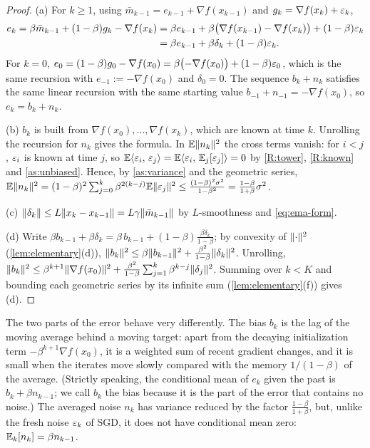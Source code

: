 \begin{proof}
(a) For $k\ge1$, using $\bar m_{k-1}=e_{k-1}+\nabla f(x_{k-1})$ and $g_k=\nabla f(x_k)+\varepsilon_k$,
\begin{align*}
  e_k=\beta\bar m_{k-1}+(1-\beta)g_k-\nabla f(x_k)
  &=\beta e_{k-1}+\beta\bigl(\nabla f(x_{k-1})-\nabla f(x_k)\bigr)+(1-\beta)\varepsilon_k\\
  &=\beta e_{k-1}+\beta\delta_k+(1-\beta)\varepsilon_k .
\end{align*}
For $k=0$, $e_0=(1-\beta)g_0-\nabla f(x_0)=\beta\bigl(-\nabla f(x_0)\bigr)+(1-\beta)\varepsilon_0$, which is the
same recursion with $e_{-1}:=-\nabla f(x_0)$ and $\delta_0=0$. The sequence $b_k+n_k$ satisfies
the same linear recursion with the same starting value $b_{-1}+n_{-1}=-\nabla f(x_0)$, so
$e_k=b_k+n_k$.

(b) $b_k$ is built from $\nabla f(x_0),\dots,\nabla f(x_k)$, which are known at time $k$.
Unrolling the recursion for $n_k$ gives the formula. In $\mathbb{E}\lVert n_k\rVert^2$ the cross terms
vanish: for $i<j$, $\varepsilon_i$ is known at time $j$, so
$\mathbb{E}\langle \varepsilon_i,\, \varepsilon_j\rangle=\mathbb{E}\langle \varepsilon_i,\, \mathbb{E}_j[\varepsilon_j]\rangle=0$ by \ref{R:tower}, \ref{R:known} and
\cref{as:unbiased}. Hence, by \cref{as:variance} and the geometric series,
$\mathbb{E}\lVert n_k\rVert^2=(1-\beta)^2\sum_{j=0}^k\beta^{2(k-j)}\mathbb{E}\lVert \varepsilon_j\rVert^2\le\frac{(1-\beta)^2\sigma^2}{1-\beta^2}
=\frac{1-\beta}{1+\beta}\sigma^2$.

(c) $\lVert \delta_k\rVert\le L\lVert x_k-x_{k-1}\rVert=L\gamma\lVert \bar m_{k-1}\rVert$ by $L$-smoothness and
\eqref{eq:ema-form}.

(d) Write $\beta b_{k-1}+\beta\delta_k=\beta\,b_{k-1}+(1-\beta)\frac{\beta\delta_k}{1-\beta}$; by
convexity of $\lVert \cdot\rVert^2$ (\cref{lem:elementary}(d)),
$\lVert b_k\rVert^2\le\beta\lVert b_{k-1}\rVert^2+\frac{\beta^2}{1-\beta}\lVert \delta_k\rVert^2$. Unrolling,
$\lVert b_k\rVert^2\le\beta^{k+1}\lVert \nabla f(x_0)\rVert^2+\frac{\beta^2}{1-\beta}\sum_{j=1}^k\beta^{k-j}\lVert \delta_j\rVert^2$.
Summing over $k<K$ and bounding each geometric series by its infinite sum
(\cref{lem:elementary}(f)) gives (d).
\end{proof}

The two parts of the error behave very differently. The bias $b_k$ is the lag of the
moving average behind a moving target: apart from the decaying initialization term
$-\beta^{k+1}\nabla f(x_0)$, it is a weighted sum of recent gradient changes, and it is small
when the iterates move slowly compared with the memory $1/(1-\beta)$ of the average.
(Strictly speaking, the conditional mean of $e_k$ given the past is $b_k+\beta n_{k-1}$; we call
$b_k$ the bias because it is the part of the error that contains no noise.) The averaged
noise $n_k$ has variance reduced by the factor $\frac{1-\beta}{1+\beta}$, but, unlike the fresh
noise $\varepsilon_k$ of SGD, it does not have conditional mean zero: $\mathbb{E}_k[n_k]=\beta n_{k-1}$.

